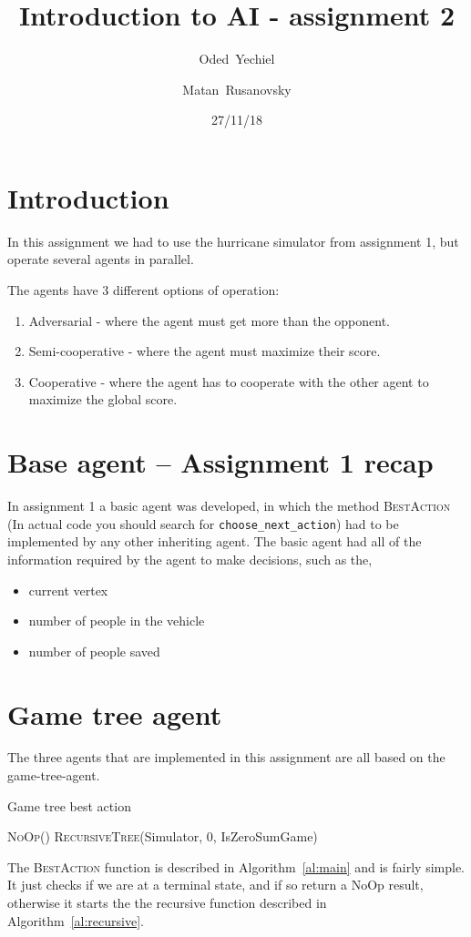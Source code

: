 \documentclass{article}                     %
\begin{document}
	
	\title{Introduction to AI - assignment 2}
	
	
	\author{Oded~Yechiel         \and
		Matan~Rusanovsky
	}
	
	\date{27/11/18}
	
	\maketitle
	
	\section{Introduction}
	In this assignment we had to use the hurricane simulator from assignment 1, but operate several agents in parallel.
	
	The agents have 3 different options of operation:
	\begin{enumerate}
		\item Adversarial - where the agent must get more than the opponent.
		\item Semi-cooperative - where the agent must maximize their score.
		\item Cooperative - where the agent has to cooperate with the other agent to maximize the global score.
	\end{enumerate}
	
	\section{Base agent -- Assignment 1 recap}
	In assignment 1 a basic agent was developed, in which the method \textsc{BestAction} (In actual code you should search for \texttt{choose\_next\_action}) had to be implemented by any other inheriting agent.
	The basic agent had all of the information required by the agent to make decisions, such as the,
	\begin{itemize}
		\item current vertex
		\item number of people in the vehicle
		\item number of people saved
	\end{itemize}
	
	\section{Game tree agent}
	The three agents that are implemented in this assignment are all based on the game-tree-agent.
	\begin{algorithm}[H]
		\label{al:main}
		\caption{Game tree best action}
		\begin{algorithmic}[1]
			\State  \Return \textsc{NoOp()}
			\EndIf
			\State \Return \textsc{RecursiveTree}(Simulator, 0, IsZeroSumGame)
			\EndProcedure
		\end{algorithmic}
	\end{algorithm}
	The  \textsc{BestAction} function is described in Algorithm~\ref{al:main} and is fairly simple. It just checks if we are at a terminal state, and if so return a NoOp result, otherwise it starts the the recursive function described in Algorithm~\ref{al:recursive}.
	
\end{document}

